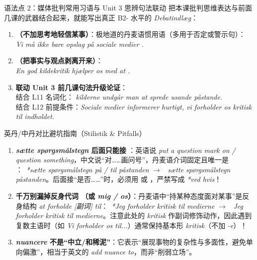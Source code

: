 \begin{grammatikbox}{语法点 2：媒体批判常用习语与 Unit 3 思辨句法联动}
把本课批判思维表达与前面几课的武器结合起来，就能写出真正 B2- 水平的 \textit{Debatindlæg}：
\begin{enumerate}
  \item \textbf{（不加思考地轻信某事）}：极地道的丹麦语惯用语（多用于否定或警示句）：\\
    \textit{Vi må ikke bare  opslag på sociale medier .}
  \item \textbf{（把事实与观点剥离开来）}：\\
    \textit{En god kildekritik hjælper os med at .}
  \item \textbf{联动 Unit 3 前几课句法升级论证}：\\
     结合 L11 名词化：\textit{ kilderne undgår man at sprede usande påstande.}\\
     结合 L12 前提条件：\textit{Sociale medier informerer hurtigt,  vi forholder os kritisk til indholdet.}
\end{enumerate}
\end{grammatikbox}

\begin{grammatikbox}{英丹/中丹对比避坑指南（Stilistik \& Pitfalls）}
\begin{enumerate}
  \item \textbf{\textit{sætte spørgsmålstegn} 后面只能接 }：英语说 \textit{put a question mark on / question something}，中文说“对……画问号”，丹麦语介词固定且唯一是 ：\ \textit{*sætte spørgsmålstegn på / til påstanden} $\rightarrow$ \ \textit{sætte spørgsmålstegn  påstanden}。后面接“是否……”时，必须用  或 ，严禁写成 \textit{*ved hvis}！
  \item \textbf{千万别漏掉反身代词 （或 \textit{mig / os}）}：丹麦语中“持某种态度面对某事”是反身结构 \textit{at forholde  [副词] til}：\ \textit{*Jeg forholder kritisk til medierne} $\rightarrow$ \ \textit{Jeg forholder  kritisk til medierne}。注意此处的 \textit{kritisk} 作副词修饰动作，因此遇到复数主语时（如 \textit{Vi forholder os  til...}）通常保持基本形 \textit{kritisk}（不加 \textit{-e}）！
  \item \textbf{\textit{nuancere} 不是“中立/和稀泥”}：它表示“展现事物的复杂性与多面性，避免单向偏激”，相当于英文的 \textit{add nuance to}，而非“削弱立场”。
\end{enumerate}
\end{grammatikbox}

